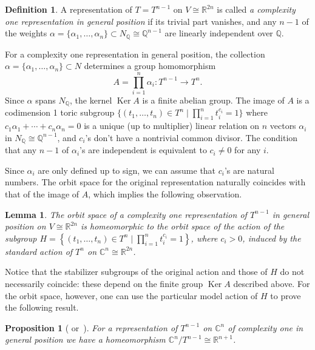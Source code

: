 \documentclass[english,12pt,oneside]{amsproc}
\DeclareMathOperator{\Ker}{Ker}
\newcommand{\Ro}{\mathbb{R}}
\newcommand{\Co}{\mathbb{C}}
\newcommand{\Qo}{\mathbb{Q}}
\newcommand{\Nq}{N_\Qo}
\newcounter{stmcounter}[section]
\numberwithin{equation}{section}
\theoremstyle{plain}
\newtheorem{prop}[stmcounter]{Proposition}
\newtheorem{lem}[stmcounter]{Lemma}
\theoremstyle{definition}
\newtheorem{defin}[stmcounter]{Definition}
\theoremstyle{remark}
\begin{document}
\begin{defin}\label{definComplOneGenPos}
A representation of $T=T^{n-1}$ on $V\cong\Ro^{2n}$ is called \emph{a complexity one representation in general position} if its trivial part vanishes, and any $n-1$ of the weights $\alpha=\{\alpha_1,\ldots,\alpha_n\}\subset\Nq\cong\Qo^{n-1}$ are linearly independent over $\Qo$.
\end{defin}

For a complexity one representation in general position, the collection $\alpha=\{\alpha_1,\ldots,\alpha_n\}\subset N$ determines a group homomorphism
\[
A=\prod_{i=1}^n\alpha_i\colon T^{n-1}\to T^n.
\]
Since $\alpha$ spans $N_\Qo$, the kernel $\Ker A$ is a finite abelian group. The image of $A$ is a codimension 1 toric subgroup $\{(t_1,\ldots,t_n)\in T^n\mid \prod_{i=1}^{n}t_i^{c_i}=1\}$ where $c_1\alpha_1+\cdots+c_n\alpha_n=0$ is a unique (up to multiplier) linear relation on $n$ vectors $\alpha_i$ in $\Nq\cong\Qo^{n-1}$, and $c_i$'s don't have a nontrivial common divisor. The condition that any $n-1$ of $\alpha_i$'s are independent is equivalent to $c_i\neq 0$ for any $i$.

Since $\alpha_i$ are only defined up to sign, we can assume that $c_i$'s are natural numbers. The orbit space for the original representation naturally coincides with that of the image of $A$, which implies the following observation.

\begin{lem}\label{lemTechnical}
The orbit space of a complexity one representation of $T^{n-1}$ in general position on $V\cong\Ro^{2n}$ is homeomorphic to the orbit space of the action of the subgroup $H=\left\{(t_1,\ldots,t_n)\in T^n\mid \prod_{i=1}^nt_i^{c_i}=1\right\}$, where $c_i>0$, induced by the standard action of $T^n$ on $\Co^n\cong \Ro^{2n}$.
\end{lem}

Notice that the stabilizer subgroups of the original action and those of $H$ do not necessarily coincide: these depend on the finite group $\Ker A$ described above. For the orbit space, however, one can use the particular model action of $H$ to prove the following result.


\begin{prop}[{\cite[Lm.2.11]{AyzCompl} or~\cite[Thm.3.6]{Styrt}}]\label{propLocalQuotient}
For a representation of $T^{n-1}$ on $\Co^n$ of complexity one in general position we have a homeomorphism $\Co^n/T^{n-1}\cong \Ro^{n+1}$.
\end{prop}
\end{document}
